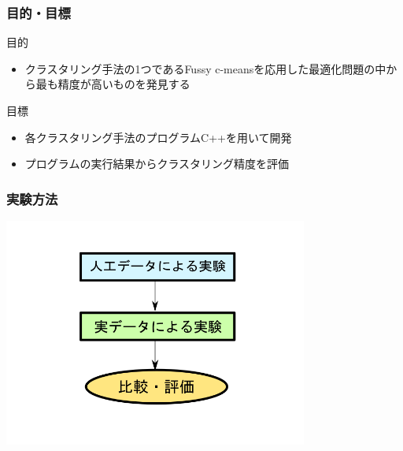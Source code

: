 \documentclass[13pt,dvipdfmx]{beamer}
\begin{document}
\begin{frame}\frametitle{目的・目標}
\begin{block}{目的}
\begin{itemize}
 \item クラスタリング手法の1つであるFussy c-meansを応用した最適化問題の中から最も精度が高いものを発見する
\end{itemize}
\end{block}
\vspace{4mm}
\begin{block}{目標}
\begin{itemize}
 \item 各クラスタリング手法のプログラムC++を用いて開発
 \item プログラムの実行結果からクラスタリング精度を評価
\end{itemize}
\end{block}
\end{frame}

\begin{frame}\frametitle{実験方法}
\begin{center}
 \includegraphics[width=100mm]{experiment_process.png}
\end{center}
\end{frame}
\end{document}

